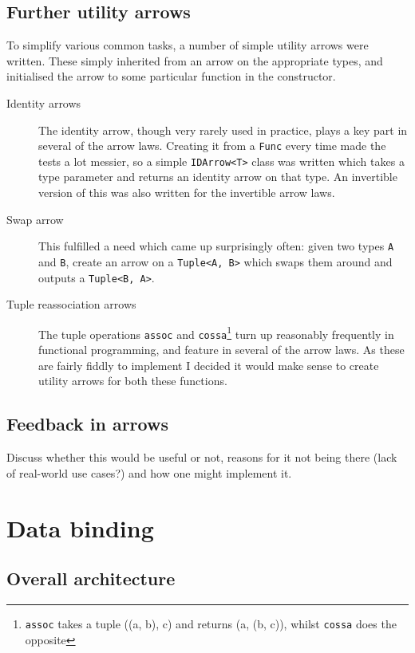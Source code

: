 \documentclass[12pt,twoside,notitlepage]{report}
\begin{document}
\subsection{Further utility arrows} \label{sec:further_utility_arrows}

To simplify various common tasks, a number of simple utility arrows were written. These simply inherited from an arrow on the appropriate types, and initialised the arrow to some particular function in the constructor.

\begin{description}
	\item[Identity arrows] The identity arrow, though very rarely used in practice, plays a key part in several of the arrow laws. Creating it from a \texttt{Func} every time made the tests a lot messier, so a simple \texttt{IDArrow<T>} class was written which takes a type parameter and returns an identity arrow on that type. An invertible version of this was also written for the invertible arrow laws.
	\item[Swap arrow] This fulfilled a need which came up surprisingly often: given two types \texttt{A} and \texttt{B}, create an arrow on a \texttt{Tuple<A, B>} which swaps them around and outputs a \texttt{Tuple<B, A>}.
	\item[Tuple reassociation arrows] The tuple operations \texttt{assoc} and \texttt{cossa}\footnote{\texttt{assoc} takes a tuple ((a, b), c) and returns (a, (b, c)), whilst \texttt{cossa} does the opposite} turn up reasonably frequently in functional programming, and feature in several of the arrow laws. As these are fairly fiddly to implement I decided it would make sense to create utility arrows for both these functions.
\end{description}

\subsection{Feedback in arrows}

Discuss whether this would be useful or not, reasons for it not being there (lack of real-world use cases?) and how one might implement it.


\section{Data binding}

\subsection{Overall architecture}
\end{document}
